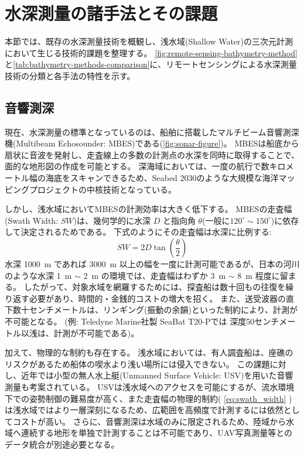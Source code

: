 \section{水深測量の諸手法とその課題}\label{sec:bg_bathymetry-method-overview}
本節では、既存の水深測量技術を概観し、浅水域(Shallow Water)の三次元計測において生じる技術的課題を整理する。
\cref{fig:remote-sensing-bathymetry-method}と\cref{tab:bathymetry-methods-comparison}に、リモートセンシングによる水深測量技術の分類と各手法の特性を示す。

\subsection{音響測深}\label{subsec:bg_sonar}


現在、水深測量の標準となっているのは、船舶に搭載したマルチビーム音響測深機(Multibeam Echosounder: MBES)である(\cref{fig:sonar-figure})。
MBESは船底から扇状に音波を発射し、走査線上の多数の計測点の水深を同時に取得することで、面的な地形図の作成を可能とする。
深海域においては、一度の航行で数キロメートル幅の海底をスキャンできるため、Seabed 2030のような大規模な海洋マッピングプロジェクトの中核技術となっている。

しかし、浅水域においてMBESの計測効率は大きく低下する。
MBESの走査幅(Swath Width: $SW$)は、幾何学的に水深 $D$ と指向角 $\theta$(一般に$120^{\circ} \sim 150^{\circ}$)に依存して決定されるためである。
下式のようにその走査幅は水深に比例する:
\begin{equation}
  SW = 2D \tan \left( \frac{\theta}{2} \right)
  \label{eq:swath_width}
\end{equation}
水深 \qty{1000}{m} であれば \qty{3000}{m} 以上の幅を一度に計測可能であるが、日本の河川のような水深 \qty{1}{m} $\sim$ \qty{2}{m} の環境では、走査幅はわずか \qty{3}{m} $\sim$ \qty{8}{m} 程度に留まる。
したがって、対象水域を網羅するためには、探査船は数十回もの往復を繰り返す必要があり、時間的・金銭的コストの増大を招く。
また、送受波器の直下数十センチメートルは、リンギング(振動の余韻)といった制約により、計測が不可能となる。
(例: Teledyne Marine社製 SeaBat T20-Pでは\cite{SeaBat_T20-P_product_leaflet} 深度50センチメートル以浅は、計測が不可能である)。

加えて、物理的な制約も存在する。
浅水域においては、有人調査船は、座礁のリスクがあるため船体の喫水より浅い場所には侵入できない。
この課題に対し、近年では小型の無人水上艇(Unmanned Surface Vehicle: USV)を用いた音響測量も考案されている\cite{Giordano2015_sonar-bathymetry,Kurowski2019_survey-USV}。
USVは浅水域へのアクセスを可能にするが、流水環境下での姿勢制御の難易度が高く、また走査幅の物理的制約( \cref{eq:swath_width} )は浅水域ではより一層深刻になるため、広範囲を高頻度で計測するには依然としてコストが高い。
さらに、音響測深は水域のみに限定されるため、陸域から水域へ連続する地形を単独で計測することは不可能であり、UAV写真測量等とのデータ統合が別途必要となる。

